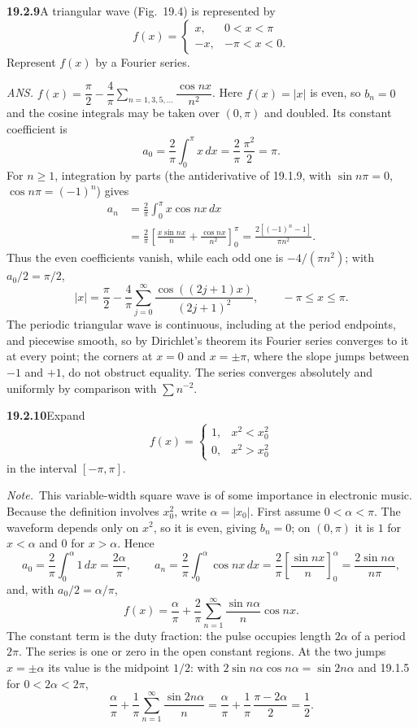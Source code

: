 \par\bigskip
\noindent\textbf{19.2.9}\quad A triangular wave (Fig.~19.4) is
represented by
\[
f(x)=\begin{cases}
x, & 0<x<\pi\\
-x, & -\pi<x<0.
\end{cases}
\]
Represent $f(x)$ by a Fourier series.
\par\nobreak\hfill\emph{ANS.}\enspace
$f(x)=\dfrac{\pi}{2}-\dfrac{4}{\pi}
\displaystyle\sum_{n=1,3,5,\ldots}\dfrac{\cos nx}{n^{2}}$.
\solution
Here $f(x)=|x|$ is even, so $b_n=0$ and the cosine integrals may be
taken over $(0,\pi)$ and doubled. Its constant coefficient is
\[
a_0=\frac2\pi\int_0^\pi x\,dx=\frac2\pi\,\frac{\pi^2}2=\pi.
\]
For $n\ge1$, integration by parts (the antiderivative of 19.1.9, with
$\sin n\pi=0$, $\cos n\pi=(-1)^n$) gives
\begin{align*}
a_n&=\frac2\pi\int_0^\pi x\cos nx\,dx\\
&=\frac2\pi\left[\frac{x\sin nx}{n}
+\frac{\cos nx}{n^2}\right]_0^\pi
=\frac{2[(-1)^n-1]}{\pi n^2}.
\end{align*}
Thus the even coefficients vanish, while each odd one is $-4/(\pi n^2)$;
with $a_0/2=\pi/2$,
\[
\boxed{|x|=\frac\pi2-\frac4\pi\sum_{j=0}^{\infty}
\frac{\cos((2j+1)x)}{(2j+1)^2},\qquad-\pi\le x\le\pi.}
\]
The periodic triangular wave is continuous, including at the period
endpoints, and piecewise smooth, so by Dirichlet's theorem its Fourier
series converges to it at every point; the corners at $x=0$ and
$x=\pm\pi$, where the slope jumps between $-1$ and $+1$, do not obstruct
equality. The series converges absolutely and uniformly by comparison
with $\sum n^{-2}$.

\par\bigskip
\noindent\textbf{19.2.10}\quad Expand
\[
f(x)=\begin{cases}
1, & x^{2}<x_{0}^{2}\\
0, & x^{2}>x_{0}^{2}
\end{cases}
\]
in the interval $[-\pi,\pi]$.
\par\emph{Note.}~This variable-width square wave is of some
importance in electronic music.
\solution
Because the definition involves $x_0^2$, write $\alpha=|x_0|$.
First assume $0<\alpha<\pi$. The waveform depends only on $x^2$, so it is
even, giving $b_n=0$; on $(0,\pi)$ it is $1$ for $x<\alpha$ and $0$ for
$x>\alpha$. Hence
\[
a_0=\frac2\pi\int_0^\alpha1\,dx=\frac{2\alpha}{\pi},
\qquad
a_n=\frac2\pi\int_0^\alpha\cos nx\,dx
=\frac2\pi\left[\frac{\sin nx}n\right]_0^\alpha
=\frac{2\sin n\alpha}{n\pi},
\]
and, with $a_0/2=\alpha/\pi$,
\[
\boxed{f(x)=\frac\alpha\pi+\frac2\pi\sum_{n=1}^{\infty}
\frac{\sin n\alpha}{n}\cos nx.}
\]
The constant term is the duty fraction: the pulse occupies length
$2\alpha$ of a period $2\pi$. The series is one or zero in the open
constant regions. At the two jumps $x=\pm\alpha$ its value is the
midpoint $1/2$: with $2\sin n\alpha\cos n\alpha=\sin2n\alpha$ and
19.1.5 for $0<2\alpha<2\pi$,
\[
\frac\alpha\pi+\frac1\pi\sum_{n=1}^{\infty}\frac{\sin2n\alpha}{n}
=\frac\alpha\pi+\frac1\pi\,\frac{\pi-2\alpha}2=\frac12.
\]

